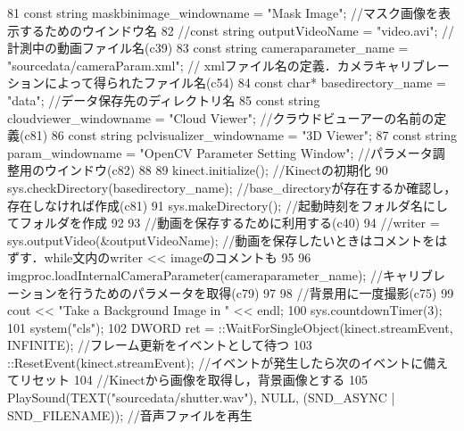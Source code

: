 \begin{DoxyCode}
81         \textcolor{keyword}{const} \textcolor{keywordtype}{string} maskbinimage\_windowname = \textcolor{stringliteral}{"Mask Image"}; \textcolor{comment}{//マスク画像を表示するためのウインドウ名}
82         \textcolor{comment}{//const string outputVideoName = "video.avi"; //計測中の動画ファイル名(c39)}
83         \textcolor{keyword}{const} \textcolor{keywordtype}{string} cameraparameter\_name = \textcolor{stringliteral}{"sourcedata/cameraParam.xml"}; \textcolor{comment}{//
      xmlファイル名の定義．カメラキャリブレーションによって得られたファイル名(c54)}
84         \textcolor{keyword}{const} \textcolor{keywordtype}{char}* basedirectory\_name = \textcolor{stringliteral}{"data"}; \textcolor{comment}{//データ保存先のディレクトリ名}
85         \textcolor{keyword}{const} \textcolor{keywordtype}{string} cloudviewer\_windowname = \textcolor{stringliteral}{"Cloud Viewer"}; \textcolor{comment}{//クラウドビューアーの名前の定義(c81)}
86         \textcolor{keyword}{const} \textcolor{keywordtype}{string} pclvisualizer\_windowname = \textcolor{stringliteral}{"3D Viewer"};
87         \textcolor{keyword}{const} \textcolor{keywordtype}{string} param\_windowname = \textcolor{stringliteral}{"OpenCV Parameter Setting Window"}; \textcolor{comment}{//パラメータ調整用のウインドウ(c82)}
88 
89         kinect.initialize(); \textcolor{comment}{//Kinectの初期化}
90         sys.checkDirectory(basedirectory\_name); \textcolor{comment}{//base\_directoryが存在するか確認し，存在しなければ作成(c81)}
91         sys.makeDirectory(); \textcolor{comment}{//起動時刻をフォルダ名にしてフォルダを作成}
92         
93         \textcolor{comment}{//動画を保存するために利用する(c40)}
94         \textcolor{comment}{//writer = sys.outputVideo(&outputVideoName); //動画を保存したいときはコメントをはずす．while文内のwriter << imageのコメントも}
95 
96         imgproc.loadInternalCameraParameter(cameraparameter\_name); \textcolor{comment}{//キャリブレーションを行うためのパラメータを取得(c79)}
97 
98         \textcolor{comment}{//背景用に一度撮影(c75)}
99         cout << \textcolor{stringliteral}{"Take a Background Image in "} << endl;
100         sys.countdownTimer(3);
101         system(\textcolor{stringliteral}{"cls"});
102         DWORD ret = ::WaitForSingleObject(kinect.streamEvent, INFINITE); \textcolor{comment}{//フレーム更新をイベントとして待つ}
103         ::ResetEvent(kinect.streamEvent); \textcolor{comment}{//イベントが発生したら次のイベントに備えてリセット}
104         \textcolor{comment}{//Kinectから画像を取得し，背景画像とする}
105         PlaySound(TEXT(\textcolor{stringliteral}{"sourcedata/shutter.wav"}), NULL, (SND\_ASYNC | SND\_FILENAME)); \textcolor{comment}{//音声ファイルを再生}

\end{DoxyCode}
